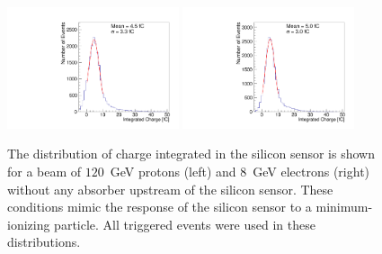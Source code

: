 
\begin{figure}[htbp] 
\centering
\includegraphics[width=0.45\textwidth]{plots/Proton_charge.pdf} 
\includegraphics[width=0.45\textwidth]{plots/Electron_0X0_charge.pdf} 
\caption{The distribution of charge integrated in the silicon sensor is shown
for a beam of $120$~GeV protons (left) and $8$~GeV electrons (right) without any
absorber upstream of the silicon sensor. These conditions mimic the response of the silicon sensor to a
minimum-ionizing particle. All triggered events were used in these
distributions.} 
\label{fig:MIP} 
\end{figure} 


